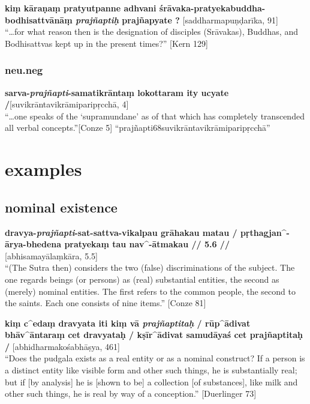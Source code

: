 \documentclass[
  letterpaper,
  DIV=11,
  numbers=noendperiod,
  oneside]{scrreprt}
\begin{document}
\textbf{kiṃ kāraṇaṃ pratyutpanne adhvani
śrāvaka-pratyekabuddha-bodhisattvānāṃ \emph{prajñaptiḥ} prajñapyate ?}
{[}saddharmapuṇḍarīka, 91{]}\\
``\ldots for what reason then is the designation of disciples
(Srāvakas), Buddhas, and Bodhisattvas kept up in the present times?''
{[}Kern 129{]}

\hypertarget{sec-examplesemprosneuneg}{%
\subsubsection{neu.neg}\label{sec-examplesemprosneuneg}}

\textbf{sarva-\emph{prajñapti}-samatikrāntaṃ lokottaram ity ucyate
/}{[}suvikrāntavikrāmiparipṛcchā, 4{]}\\
``\ldots one speaks of the `supramundane' as of that which has
completely transcended all verbal concepts.''{[}Conze 5{]}
``prajñapti68suvikrāntavikrāmiparipṛcchā''

\hypertarget{examples}{%
\section{examples}\label{examples}}

\hypertarget{sec-examplesnominalexistence}{%
\subsection{nominal existence}\label{sec-examplesnominalexistence}}

\textbf{dravya-\emph{prajñapti}-sat-sattva-vikalpau grāhakau matau /
pṛthagjan\^{}-ārya-bhedena pratyekaṃ tau nav\^{}-ātmakau // 5.6 //}
{[}abhisamayālaṃkāra, 5.5{]}\\
``(The Sutra then) considers the two (false) discriminations of the
subject. The one regards beings (or persons) as (real) substantial
entities, the second as (merely) nominal entities. The first refers to
the common people, the second to the saints. Each one consists of nine
items.'' {[}Conze 81{]}

\textbf{kiṃ c\^{}edaṃ dravyata iti kiṃ vā \emph{prajñaptitaḥ} /
rūp\^{}ādivat bhāv\^{}āntaraṃ cet dravyataḥ / kṣīr\^{}ādivat samudāyaś
cet prajñaptitaḥ /} {[}abhidharmakośabhāṣya, 461{]}\\
``Does the pudgala exists as a real entity or as a nominal construct? If
a person is a distinct entity like visible form and other such things,
he is substantially real; but if {[}by analysis{]} he is {[}shown to
be{]} a collection {[}of substances{]}, like milk and other such things,
he is real by way of a conception.'' {[}Duerlinger 73{]}
\end{document}
